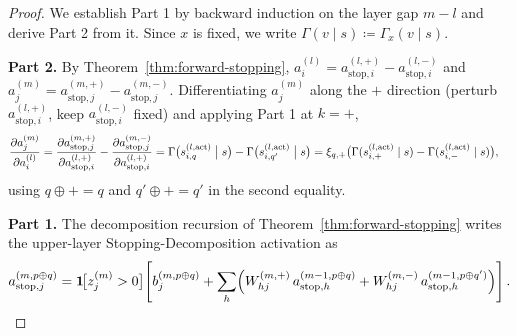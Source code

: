 \documentclass[twoside]{article}
\newcommand{\1}{\mathbf{1}}
\begin{document}
\begin{proof}
We establish Part 1 by backward induction on the layer gap $m - l$ and derive Part 2 from it. Since
$x$ is fixed, we write $\Gamma(v \mid s) \coloneqq \Gamma_x(v \mid s)$.

\textbf{Part 2.} By Theorem~\ref{thm:forward-stopping}, $a_i^{(l)} = a_{\mathrm{stop},i}^{(l,+)} -
    a_{\mathrm{stop},i}^{(l,-)}$ and $a_j^{(m)} = a_{\mathrm{stop},j}^{(m,+)} -
    a_{\mathrm{stop},j}^{(m,-)}$. Differentiating $a_j^{(m)}$ along the $+$ direction (perturb
$a_{\mathrm{stop},i}^{(l,+)}$, keep $a_{\mathrm{stop},i}^{(l,-)}$ fixed) and applying Part 1 at
$k=+$,
\begin{align}
    \frac{\partial a_j^{(m)}}{\partial a_i^{(l)}}
    &= \frac{\partial a_{\mathrm{stop},j}^{(m,+)}}{\partial a_{\mathrm{stop},i}^{(l,+)}}
    - \frac{\partial a_{\mathrm{stop},j}^{(m,-)}}{\partial a_{\mathrm{stop},i}^{(l,+)}}
    = \Gamma\bigl(s_{i, q}^{(l, \mathrm{act})} \bigm| s\bigr) - \Gamma\bigl(s_{i, q'}^{(l,
    \mathrm{act})} \bigm| s\bigr)
    = \xi_{q,+}\bigl(\Gamma(s_{i,+}^{(l, \mathrm{act})} \mid s) - \Gamma(s_{i,-}^{(l, \mathrm{act})}
    \mid s)\bigr),
\end{align}
using $q \oplus + = q$ and $q' \oplus + = q'$ in the second equality.

\textbf{Part 1.} The decomposition recursion of Theorem~\ref{thm:forward-stopping} writes the
upper-layer Stopping-Decomposition activation as
\begin{align}\label{eq:adf-astop-recursion}
    a_{\mathrm{stop},j}^{(m, p \oplus q)}
    = \1\!\bigl[z_j^{(m)} > 0\bigr]\!\left[
    b_j^{(m, p \oplus q)}
    + \sum_h \Bigl( W_{hj}^{(m,+)}\, a_{\mathrm{stop},h}^{(m-1, p \oplus q)} + W_{hj}^{(m,-)}\,
    a_{\mathrm{stop},h}^{(m-1, p \oplus q')} \Bigr)
    \right].
\end{align}


\end{proof}
\end{document}
